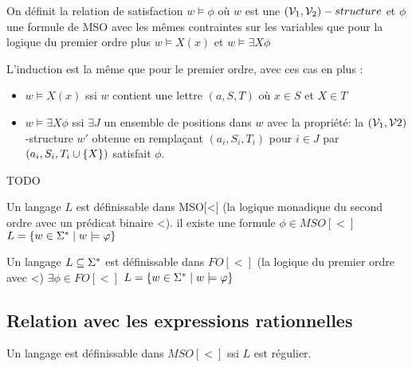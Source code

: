 \begin{definition}
	On définit la relation de satisfaction $w \models \phi$ où $w$ est une $(\mathcal{V}_1, \mathcal{V}_2)-structure$ et $\phi$ une formule de
	MSO avec les mêmes contraintes sur les variables que pour la logique du premier ordre %
	plus $w \models X(x)$ et $w \models \exists X \phi$
\end{definition}

L'induction est la même que pour le premier ordre, avec ces cas en plus :
\begin{itemize}
	\item $w \models X (x)$ ssi $w$ contient une lettre $(a,S,T)$ où $x \in S$ et $X \in T$
	\item $w \models \exists X \phi$ ssi $\exists J$ un ensemble de positions dans $w$ avec la propriété:
	      la $(\mathcal{V}_1, \mathcal{V}2)$-structure $w'$ obtenue en remplaçant $(a_i, S_i,T_i)$ pour $i \in J$ par $(a_i, S_i, T_i \cup \left\{X\right\})$ satisfait $\phi$.
\end{itemize}


\begin{exemple}
	TODO
\end{exemple}


\begin{definition}
	Un langage $L$ est définissable dans MSO[<] (la logique monadique du second ordre avec un prédicat binaire <).
	\ssi il existe une formule $\phi \in MSO[<]$ \tlq $L = \left\{w\in \Sigma^{*} \mid w \models \varphi\right\}$
\end{definition}

\begin{definition}
	Un langage $L \subseteq \Sigma^{*}$ est définissable dans $FO[<]$ (la logique du premier ordre avec <)
	\ssi $\exists \phi \in FO[<]$ \tlq $L = \left\{w \in \Sigma^{*} \mid w \models \varphi\right\}$
\end{definition}


\subsection{Relation avec les expressions rationnelles}

\begin{theorem}
	Un langage est définissable dans $MSO[<]$ ssi $L$ est régulier.
\end{theorem}


